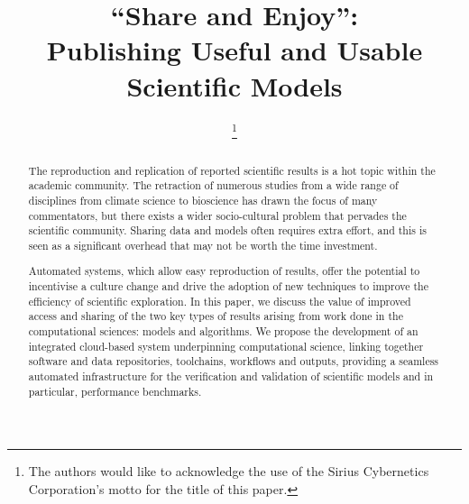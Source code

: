\documentclass[conference]{IEEEtran}
\begin{document}

\title{``Share and Enjoy'':\\Publishing Useful and Usable Scientific Models}

\author{
%
\thanks{The authors would like to acknowledge the use of the Sirius Cybernetics
  Corporation's motto for the title of this paper. }
\and
{}
}

\maketitle

\begin{abstract}
The reproduction and replication of reported scientific results is a
hot topic within the academic community. The retraction of numerous
studies from a wide range of disciplines from climate science to
bioscience has drawn the focus of many commentators, but there exists
a wider socio-cultural problem that pervades the scientific community.
Sharing data and models often requires extra effort, and this is seen
as a significant overhead that may not be worth the time investment.

Automated systems, which allow easy reproduction of results, offer the
potential to incentivise a culture change and drive the adoption of
new techniques to improve the efficiency of scientific exploration. In
this paper, we discuss the value of improved access and sharing of the
two key types of results arising from work done in the computational
sciences: models and algorithms. We propose the development of an
integrated cloud-based system underpinning computational science,
linking together software and data repositories, toolchains, workflows
and outputs, providing a seamless automated infrastructure for the
verification and validation of scientific models and in particular,
performance benchmarks.
\end{abstract}
\end{document}
